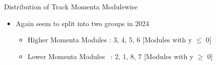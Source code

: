 \begin{frame}{Distribution of Track Momenta Modulewise}
    \begin{itemize}
        \small
        \item Again seem to split into two groups in 2024
        \begin{itemize}
            \item Higher Momenta Modules : 3, 4, 5, 6  [Modules with y $\leq$ 0]
            \item Lower Momenta Modules \ : 2, 1, 8, 7 [Modules with y $\geq$ 0]
        \end{itemize}
    \end{itemize}
\end{frame}

    

